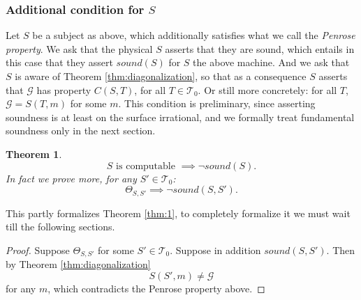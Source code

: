 \documentclass{amsart}  %
\numberwithin{equation}{section}
\newtheorem{theorem}[equation]{Theorem}
\newtheorem{remark}[equation]{Remark}
\theoremstyle{definition}
\theoremstyle{remark}
\begin{document}
{\subsubsection*{Additional condition for $S$}
Let $S $ be a subject as above, which additionally satisfies what we call the \emph{Penrose property}.
We ask that the physical $S$ asserts that they are sound, which entails in this case that they assert $sound (S)$ for $S$ the above machine. And we ask that $S$ is aware of Theorem \ref{thm:diagonalization}, so that as a consequence $S$ asserts that $\mathcal{G}$ has property $C (S,T)$, for all $T \in \mathcal{T} _{0} $. Or still more concretely: for all $T$, $\mathcal{G}= S (T,m)$ for some $m$. This condition is preliminary, since asserting soundness is at least on the surface irrational, and we formally treat fundamental soundness only in the next section.  
\begin{theorem} 
\begin{equation*}
S  \text{ is computable } \implies \neg sound (S  ). 
\end{equation*}
In fact we prove more, for any $S' \in \mathcal{T} _{0} $:
\begin{equation*}
   \Theta _{S, S'} \implies   \neg sound (S ,S' ) .
\end{equation*}
\end{theorem} 
 This partly formalizes Theorem \ref{thm:1}, to completely formalize it we must wait till the following sections.
\begin{proof}
Suppose $\Theta _{S, S'}$ for some $S' \in \mathcal{T} _{0} $.
Suppose in addition $sound (S,S' )$.  Then  by Theorem \ref{thm:diagonalization} $$S   (S',m) \neq \mathcal{G} $$ for any $m$, which contradicts the Penrose property above.
%
\end {proof}

}
\end{document}
